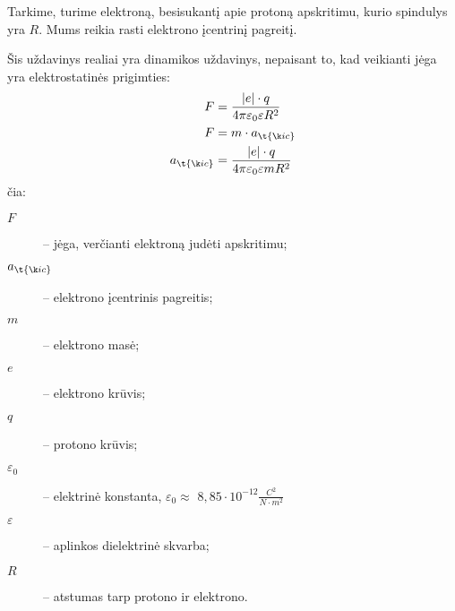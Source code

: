 \begin{exmp}
  Tarkime, turime elektroną, besisukantį apie protoną apskritimu, kurio
  spindulys yra $R$. Mums reikia rasti elektrono 
  įcentrinį pagreitį.

  Šis uždavinys realiai yra dinamikos uždavinys, nepaisant to, kad
  veikianti jėga yra elektrostatinės prigimties:
  \begin{align*}
    F &= \frac{|e| \cdot q}{4 \pi \varepsilon_{0} \varepsilon R^{2}} \\
    F &= m \cdot a_{\t{įc}} \\
    a_{\t{įc}}
    &= \frac{|e| \cdot q}{4 \pi \varepsilon_{0} \varepsilon m R^{2}} \\
  \end{align*}
  čia:
  \begin{description}
    \item[$F$] – jėga, verčianti elektroną judėti apskritimu;
    \item[$a_{\t{įc}}$] – elektrono įcentrinis pagreitis;
    \item[$m$] – elektrono masė;
    \item[$e$] – elektrono krūvis;
    \item[$q$] – protono krūvis;
    \item[$\varepsilon_{0}$] – elektrinė konstanta,
      $\varepsilon_{0} \approx $
      $8,85 \cdot 10^{-12} \frac{C^{2}}{N \cdot m^{2}}$
    \item[$\varepsilon$] – aplinkos dielektrinė skvarba;
    \item[$R$] – atstumas tarp protono ir elektrono.
  \end{description}
\end{exmp}
